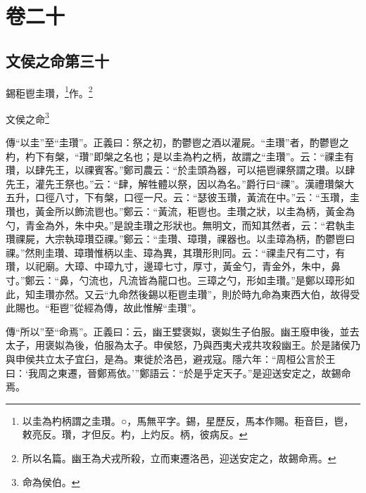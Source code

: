 

\chapter{卷二十}


\section{文侯之命第三十}


錫秬鬯圭瓚，\footnote{以圭為杓柄謂之圭瓚。○，馬無平字。錫，星歷反，馬本作賜。秬音巨，鬯，敕亮反。瓚，才但反。杓，上灼反。柄，彼病反。}作。\footnote{所以名篇。幽王為犬戎所殺，立而東遷洛邑，迎送安定之，故錫命焉。}

文侯之命\footnote{命為侯伯。}

{\noindent\zhuan{}\fzbyks 傳“以圭”至“圭瓚”。正義曰：祭之初，酌鬱鬯之酒以灌屍。“圭瓚”者，酌鬱鬯之杓，杓下有槃，“瓚”即槃之名也；是以圭為杓之柄，故謂之“圭瓚”。云：“祼圭有瓚，以肆先王，以祼賓客。”鄭司農云：“於圭頭為器，可以挹鬯祼祭謂之瓚。以肆先王，灌先王祭也。”云：“肆，解牲體以祭，因以為名。”爵行曰“祼”。漢禮瓚槃大五升，口徑八寸，下有槃，口徑一尺。云：“瑟彼玉瓚，黃流在中。”云：“玉瓚，圭瓚也，黃金所以飾流鬯也。”鄭云：“黃流，秬鬯也。圭瓚之狀，以圭為柄，黃金為勺，青金為外，朱中央。”是說圭瓚之形狀也。無明文，而知其然者，云：“君執圭瓚祼屍，大宗執璋瓚亞祼。”鄭云：“圭瓚、璋瓚，祼器也。以圭璋為柄，酌鬱鬯曰祼。”然則圭瓚、璋瓚惟柄以圭、璋為異，其瓚形則同。云：“祼圭尺有二寸，有瓚，以祀廟。大璋、中璋九寸，邊璋七寸，厚寸，黃金勺，青金外，朱中，鼻寸。”鄭云：“鼻，勺流也，凡流皆為龍口也。三璋之勺，形如圭瓚。”是鄭以璋形如此，知圭瓚亦然。又云“九命然後錫以秬鬯圭瓚”，則於時九命為東西大伯，故得受此賜也。“秬鬯”從經為傳，故此惟解“圭瓚”。 \par}

{\noindent\zhuan{}\fzbyks 傳“所以”至“命焉”。正義曰：云，幽王嬖褒姒，褒姒生子伯服。幽王廢申後，並去太子，用褒姒為後，伯服為太子。申侯怒，乃與西夷犬戎共攻殺幽王。於是諸侯乃與申侯共立太子宜臼，是為。東徙於洛邑，避戎寇。隱六年：“周桓公言於王曰：‘我周之東遷，晉鄭焉依。’”鄭語云：“於是乎定天子。”是迎送安定之，故錫命焉。 \par}

